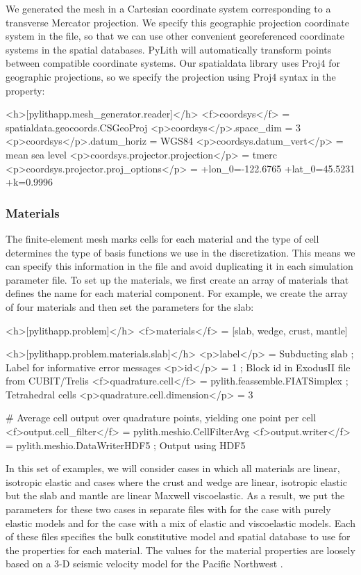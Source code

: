 We generated the mesh in a Cartesian coordinate system corresponding
to a transverse Mercator projection. We specify this geographic
projection coordinate system in the  file, so
that we can use other convenient georeferenced coordinate systems in
the spatial databases. PyLith will automatically transform points
between compatible coordinate systems. Our spatialdata library uses
Proj4 for geographic projections, so we specify the projection using
Proj4 syntax in the  property:
\begin{cfg}
<h>[pylithapp.mesh_generator.reader]</h>
<f>coordsys</f> = spatialdata.geocoords.CSGeoProj
<p>coordsys</p>.space_dim = 3
<p>coordsys</p>.datum_horiz = WGS84
<p>coordsys.datum_vert</p> = mean sea level
<p>coordsys.projector.projection</p> = tmerc
<p>coordsys.projector.proj_options</p> = +lon_0=-122.6765 +lat_0=45.5231 +k=0.9996
\end{cfg}

\subsubsection{Materials}

The finite-element mesh marks cells for each material and the type of
cell determines the type of basis functions we use in the
discretization. This means we can specify this information in the
 file and avoid duplicating it in each
simulation parameter file. To set up the materials, we first create an
array of materials that defines the name for each material component.
For example, we create the array of four materials and then set the
parameters for the slab:
\begin{cfg}
<h>[pylithapp.problem]</h>
<f>materials</f> = [slab, wedge, crust, mantle]

<h>[pylithapp.problem.materials.slab]</h>
<p>label</p> = Subducting slab ; Label for informative error messages
<p>id</p> = 1 ; Block id in ExodusII file from CUBIT/Trelis
<f>quadrature.cell</f> = pylith.feassemble.FIATSimplex ; Tetrahedral cells
<p>quadrature.cell.dimension</p> = 3

# Average cell output over quadrature points, yielding one point per cell
<f>output.cell_filter</f> = pylith.meshio.CellFilterAvg
<f>output.writer</f> = pylith.meshio.DataWriterHDF5 ; Output using HDF5
\end{cfg}

In this set of examples, we will consider cases in which all materials
are linear, isotropic elastic and cases where the crust and wedge are
linear, isotropic elastic but the slab and mantle are linear Maxwell
viscoelastic. As a result, we put the parameters for these two cases
in separate  files with  for
the case with purely elastic models and
 for the case with a mix of elastic
and viscoelastic models. Each of these files specifies the bulk
constitutive model and spatial database to use for the properties for
each material. The values for the material properties are loosely
based on a 3-D seismic velocity model for the Pacific Northwest 
\cite{Stephenson:2007}.

